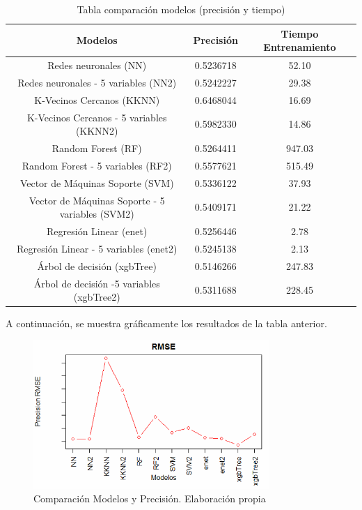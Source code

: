 \begin{subappendices}
\begin{table}[!ht]
	\caption{Tabla comparación modelos (precisión y tiempo)}
	\label{tab:ComparacionModelos}
	\centering
\begin{tabular}{|c|c|c|}
	\hline 
	Modelos & Precisión & Tiempo Entrenamiento \\ 
	\hline 
	Redes neuronales (NN) & 0.5236718 & 52.10 \\ 
	\hline 
	Redes neuronales - 5 variables (NN2) & 0.5242227 & 29.38 \\ 
	\hline 
	K-Vecinos Cercanos (KKNN) & 0.6468044 & 16.69 \\ 
	\hline 
	K-Vecinos Cercanos - 5 variables (KKNN2) & 0.5982330 & 14.86 \\ 
	\hline 
	Random Forest (RF) & 0.5264411 & 947.03 \\ 
	\hline 
	Random Forest - 5 variables (RF2) & 0.5577621 & 515.49 \\ 
	\hline 
	Vector de Máquinas Soporte (SVM) & 0.5336122 & 37.93 \\ 
	\hline 
	Vector de Máquinas Soporte - 5 variables (SVM2) & 0.5409171 & 21.22 \\ 
	\hline 
	Regresión Linear (enet) & 0.5256446 & 2.78 \\ 
	\hline 
	Regresión Linear - 5 variables (enet2) & 0.5245138 & 2.13 \\ 
	\hline 
	Árbol de decisión (xgbTree) & 0.5146266 & 247.83 \\ 
	\hline 
	Árbol de decisión -5 variables (xgbTree2) & 0.5311688 & 228.45 \\ 
	\hline 
\end{tabular} 
\end{table}
\FloatBarrier

A continuación, se muestra gráficamente los resultados de la tabla anterior.

\begin{figure}[htb]
	\centering
	\caption{Comparación Modelos y Precisión. Elaboración propia}
	\label{fig:ComparacionModelosII}
	\includegraphics[width=0.8\textwidth]{recursos/ImagenesR/ComparacionModelos2}
\end{figure}
\FloatBarrier


\end{subappendices}
